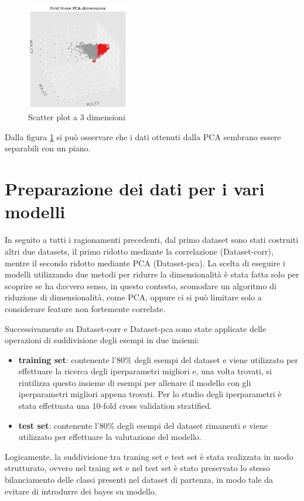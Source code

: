 \begin{figure}[!ht]
      \centering
      \includegraphics[width=0.4\textwidth]{img/analisi/pcaNuovoDataset.png}
      \caption{Scatter plot a 3 dimensioni}
      \label{fig:pca-3d}
\end{figure}

Dalla figura \ref{fig:pca-3d} si può osservare che i dati ottenuti dalla PCA
sembrano essere separabili con un piano.

\section{Preparazione dei dati per i vari modelli}
In seguito a tutti i ragionamenti precedenti, dal primo dataset sono stati costruiti 
altri due datasets, il primo ridotto mediante la correlazione (Dataset-corr), 
mentre il secondo ridotto mediante PCA (Dataset-pca). La scelta di eseguire i
modelli utilizzando due metodi per ridurre la dimensionalità è stata fatta solo
per scoprire se ha davvero senso, in questo contesto, scomodare un algoritmo di 
riduzione di dimensionalità, come PCA, oppure ci si può limitare solo a considerare
feature non fortemente correlate.

Successivamente su Dataset-corr e Dataset-pca sono state applicate delle operazioni 
di suddivisione degli esempi in due insiemi:
\begin{itemize}
      \item \textbf{training set}: contenente l'$80\%$ degli esempi del dataset e viene
      utilizzato per effettuare la ricerca degli iperparametri migliori e, una volta
      trovati, si riutilizza questo insieme di esempi per allenare il modello con 
      gli iperparametri migliori appena trovati. Per lo studio degli iperparametri
      è stata effettuata una 10-fold cross validation stratified.
      \item \textbf{test set}: contenente l'$80\%$ degli esempi del dataset 
      rimanenti e viene utilizzato per effettuare la valutazione del modello.
\end{itemize}
Logicamente, la suddivisione tra traning set e test set è stata realizzata
in modo strutturato, ovvero nel traing set e nel test set è stato preservato lo 
stesso bilanciamento delle classi presenti nel dataset di partenza, in modo tale 
da evitare di introdurre dei bayes su modello. 

